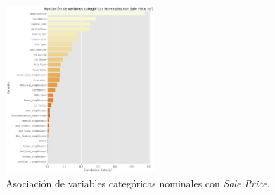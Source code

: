 \begin{figure}[ht]
	\begin{center}
	\includegraphics[width=0.5\textwidth]{figures/Asociación de variables categóricas nominales con Sale Price.png}
	\caption[Asociación de variables categóricas nominales con \textit{Sale Price}.]{Asociación de variables categóricas nominales con \textit{Sale Price}.}
	\label{fig:asociación categórica nominal con SP}
	\end{center}
\end{figure}

